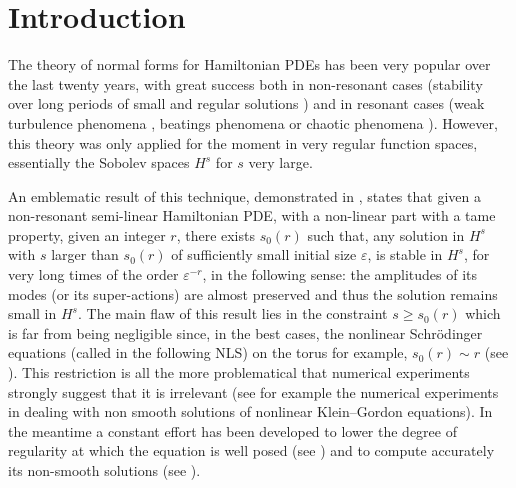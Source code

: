 \section{Introduction}

The theory of normal forms for Hamiltonian PDEs has been very popular over the last twenty years, with great success both in non-resonant cases (stability over long periods of small and regular solutions \cite{Bou96,Bam99,Bou00,Bam03,BG06,BDGS07,GIP,Del12,FGL13,YZ14,BD17,FI19,KillBill,BMP20,FI20,KtA}) and in resonant cases (weak turbulence phenomena \cite{CKSTT10,CF12,GG12,GK15}, beatings phenomena \cite{GV,GT12,HP17} or chaotic phenomena \cite{GGMP21}). However, this theory was only applied for the moment in very regular function spaces, essentially the Sobolev spaces $H^s$ for $s$ very large.\enlargethispage{\baselineskip}%

An emblematic result of this technique, demonstrated in \cite{BG06}, states that given a non-resonant semi-linear Hamiltonian PDE, with a non-linear part with a tame property, given an integer $r$, there exists $s_0(r)$ such that, any solution in $H^s$ with $s$ larger than $s_0(r)$ of sufficiently small initial size $\varepsilon$, is stable in $H^s$, for very long times of the order $\varepsilon^{-r}$, in the following sense: the amplitudes of its modes (or its super-actions) are almost preserved and thus the solution remains small in $H^s$. The main flaw of this result lies in the constraint $s\geq s_0(r)$ which is far from being negligible since, in the best cases, the nonlinear Schrödinger equations (called in the following NLS) on the torus for example, $s_0(r)\sim r$ (see \cite{BMP20}). This restriction is all the more problematical that numerical experiments strongly suggest that it is irrelevant (see for example the numerical experiments in \cite{CHL08a,CHL08b} dealing with non smooth solutions of nonlinear Klein--Gordon equations). In the meantime a constant effort has been developed to lower the degree of regularity at which the equation is well posed (see \eg \cite{Vla84,Bou93,Bou99,Caz03,BGT05}) and to compute accurately its non-smooth solutions (see \eg \cite{HS17,ORS20}).

